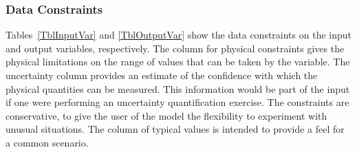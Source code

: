 \documentclass[12pt]{article}
\begin{document}
\subsubsection{Data Constraints} \label{sec_DataConstraints}    

Tables~\ref{TblInputVar} and \ref{TblOutputVar} show the data constraints on 
the input and output variables, respectively. The column for physical 
constraints gives the physical limitations on the range of values that can be 
taken by the variable. The uncertainty column provides an estimate of the 
confidence with which the physical quantities can be measured. This information 
would be part of the input if one were performing an uncertainty quantification 
exercise. The constraints are conservative, to give the user of the model the 
flexibility to experiment with unusual situations. The column of typical values 
is intended to provide a feel for a common scenario.

\newpage
\end{document}
